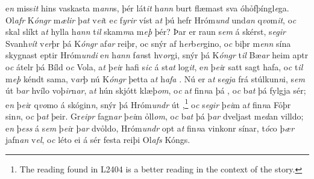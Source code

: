 e\textit{n}  miss\textit{it}  hins vaskasta m\textit{ann}s,   þér  lát\textit{it} h\textit{ann} burt flæmast sva
óhỏfþíngl\textit{e}ga. Ol\textit{afr} K\textit{óngr} m\textit{ælir} þ\textit{at} v\textit{ei}t e\textit{c} f\textit{yrir} víst
a\textit{t} þú hefr Hróm\textit{und} und\textit{an}
q\textit{vo}m\textit{it}, 
o\textit{c} skal   slíkt   a\textit{t} hylla h\textit{ann} t\textit{il} skam\textit{m}a m\textit{eþ}
þér? Þar  er raun s\textit{em} á skérst, s\textit{egir}
Svanh\textit{vít} v\textit{er}þr þá K\textit{óngr} af\textit{ar} reiþr, oc
snýr   af h\textit{er}b\textit{er}gino, 
o\textit{c} biþr m\textit{enn} sína   skygnast eptir  Hróm\textit{undi} e\textit{n} h\textit{ann}
f\textit{an}st hv\textit{or}gi, snýr þá K\textit{óngr} t\textit{il}
Bæ\textit{ar} heim aptr  o\textit{c}  átelr   þá Bíld o\textit{c} Vola, a\textit{t}
þ\textit{ei}r hafi s\textit{ic} á st\textit{at} log\textit{it}, e\textit{n}
þ\textit{ei}r   satt sagt hafa, 
o\textit{c} t\textit{il}   m\textit{eþ} kéndt   sama, 
v\textit{ar}þ nú K\textit{óngr} þetta   a\textit{t} h\textit{afa} .  
Nú er a\textit{t} s\textit{egja} frá stúlkun\textit{n}i,
s\textit{em} út b\textit{ar} hvílo  voþ\textit{ir}n\textit{ar},
 a\textit{t} hún    skjótt   klæþ\textit{om}, o\textit{c}  a\textit{t} fin\textit{n}a þá  , o\textit{c} b\textit{at} þá fylgja sér; e\textit{n}  þ\textit{ei}r q\textit{vo}mo á skógin\textit{n}, snýr þá Hróm\textit{undr} út  ,\footnote{The reading found in L2404 is a better reading in the context of the story.}  o\textit{c} s\textit{egir} þ\textit{ei}m a\textit{t}
fin\textit{n}a Fỏþr sin\textit{n}, o\textit{c} þ\textit{at}  þeir.  Gr\textit{eipr} fagn\textit{ar} þ\textit{ei}m
ỏll\textit{om}, o\textit{c} b\textit{at} þá þ\textit{ar}  dveljast m\textit{ed}an villdo;  e\textit{n} þ\textit{ess} á   
s\textit{em} þ\textit{ei}r þ\textit{ar} dvỏldo,  
 Hróm\textit{undr} opt a\textit{t} fin\textit{n}a  vinkonr
sínar,   t\textit{óc}o þ\textit{ær}  jafn\textit{an} v\textit{el}, o\textit{c} léto ei á  sér
festa reiþi Ol\textit{afs} Kóngs. \pend \endnumbering  

